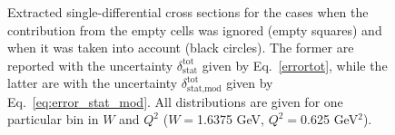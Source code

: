 \begin{figure}[htp]
\begin{center}
\caption{\small Extracted single-differential cross sections for the cases when the contribution from the empty cells was ignored (empty squares) and when it was taken into account (black circles). The former are reported with the uncertainty $\delta_{\text{stat}}^{\text{tot}}$ given by Eq.~\eqref{errortot}, while the latter are with the uncertainty $\delta_{\text{stat,mod}}^{\text{tot}}$ given by Eq.~\eqref{eq:error_stat_mod}. All distributions are given for one particular bin in $W$ and $Q^2$ ($W = $1.6375 GeV, $Q^2 = $0.625 GeV$^2$).} \label{fig:empt_corr}
\end{center}
\end{figure}


